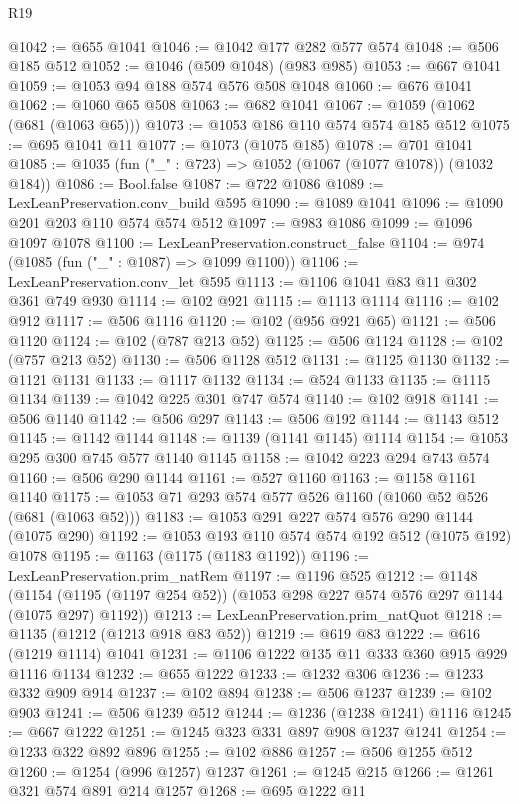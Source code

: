 \begin{lexlean}{R19}
\begin{coremodule}
@1042 := @655 @1041
@1046 := @1042 @177 @282 @577 @574
@1048 := @506 @185 @512
@1052 := @1046 (@509 @1048) (@983 @985)
@1053 := @667 @1041
@1059 := @1053 @94 @188 @574 @576 @508 @1048
@1060 := @676 @1041
@1062 := @1060 @65 @508
@1063 := @682 @1041
@1067 := @1059 (@1062 (@681 (@1063 @65)))
@1073 := @1053 @186 @110 @574 @574 @185 @512
@1075 := @695 @1041 @11
@1077 := @1073 (@1075 @185)
@1078 := @701 @1041
@1085 := @1035 (fun ("_" : @723) => @1052 (@1067 (@1077 @1078)) (@1032 @184))
@1086 := Bool.false
@1087 := @722 @1086
@1089 := LexLeanPreservation.conv_build @595
@1090 := @1089 @1041
@1096 := @1090 @201 @203 @110 @574 @574 @512
@1097 := @983 @1086
@1099 := @1096 @1097 @1078
@1100 := LexLeanPreservation.construct_false
@1104 := @974 (@1085 (fun ("_" : @1087) => @1099 @1100))
@1106 := LexLeanPreservation.conv_let @595
@1113 := @1106 @1041 @83 @11 @302 @361 @749 @930
@1114 := @102 @921
@1115 := @1113 @1114
@1116 := @102 @912
@1117 := @506 @1116
@1120 := @102 (@956 @921 @65)
@1121 := @506 @1120
@1124 := @102 (@787 @213 @52)
@1125 := @506 @1124
@1128 := @102 (@757 @213 @52)
@1130 := @506 @1128 @512
@1131 := @1125 @1130
@1132 := @1121 @1131
@1133 := @1117 @1132
@1134 := @524 @1133
@1135 := @1115 @1134
@1139 := @1042 @225 @301 @747 @574
@1140 := @102 @918
@1141 := @506 @1140
@1142 := @506 @297
@1143 := @506 @192
@1144 := @1143 @512
@1145 := @1142 @1144
@1148 := @1139 (@1141 @1145) @1114
@1154 := @1053 @295 @300 @745 @577 @1140 @1145
@1158 := @1042 @223 @294 @743 @574
@1160 := @506 @290 @1144
@1161 := @527 @1160
@1163 := @1158 @1161 @1140
@1175 := @1053 @71 @293 @574 @577 @526 @1160 (@1060 @52 @526 (@681 (@1063 @52)))
@1183 := @1053 @291 @227 @574 @576 @290 @1144 (@1075 @290)
@1192 := @1053 @193 @110 @574 @574 @192 @512 (@1075 @192) @1078
@1195 := @1163 (@1175 (@1183 @1192))
@1196 := LexLeanPreservation.prim_natRem
@1197 := @1196 @525
@1212 := @1148
    (@1154 (@1195 (@1197 @254 @52)) (@1053 @298 @227 @574 @576 @297 @1144 (@1075 @297) @1192))
@1213 := LexLeanPreservation.prim_natQuot
@1218 := @1135 (@1212 (@1213 @918 @83 @52))
@1219 := @619 @83
@1222 := @616 (@1219 @1114) @1041
@1231 := @1106 @1222 @135 @11 @333 @360 @915 @929 @1116 @1134
@1232 := @655 @1222
@1233 := @1232 @306
@1236 := @1233 @332 @909 @914
@1237 := @102 @894
@1238 := @506 @1237
@1239 := @102 @903
@1241 := @506 @1239 @512
@1244 := @1236 (@1238 @1241) @1116
@1245 := @667 @1222
@1251 := @1245 @323 @331 @897 @908 @1237 @1241
@1254 := @1233 @322 @892 @896
@1255 := @102 @886
@1257 := @506 @1255 @512
@1260 := @1254 (@996 @1257) @1237
@1261 := @1245 @215
@1266 := @1261 @321 @574 @891 @214 @1257
@1268 := @695 @1222 @11

\end{coremodule}
\end{lexlean}
